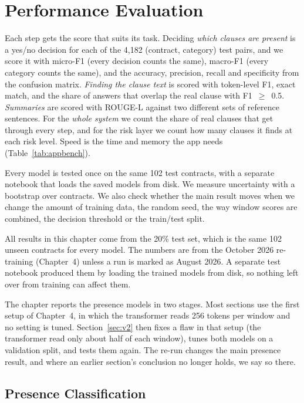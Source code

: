 \section{Performance Evaluation}
Each step gets the score that suits its task. Deciding \emph{which clauses are present} is a yes/no decision for each of the 4{,}182 (contract, category) test pairs, and we score it with micro-F1 (every decision counts the same), macro-F1 (every category counts the same), and the accuracy, precision, recall and specificity from the confusion matrix. \emph{Finding the clause text} is scored with token-level F1, exact match, and the share of answers that overlap the real clause with F1~$\geq$~0.5. \emph{Summaries} are scored with ROUGE-L against two different sets of reference sentences. For the \emph{whole system} we count the share of real clauses that get through every step, and for the risk layer we count how many clauses it finds at each risk level. Speed is the time and memory the app needs (Table~\ref{tab:appbench}).

Every model is tested once on the same 102 test contracts, with a separate notebook that loads the saved models from disk. We measure uncertainty with a bootstrap over contracts. We also check whether the main result moves when we change the amount of training data, the random seed, the way window scores are combined, the decision threshold or the train/test split.

All results in this chapter come from the 20\% test set, which is the same 102 unseen contracts for every model. The numbers are from the October 2026 re-training (Chapter~4) unless a run is marked as August 2026. A separate test notebook produced them by loading the trained models from disk, so nothing left over from training can affect them.

The chapter reports the presence models in two stages. Most sections use the first setup of Chapter~4, in which the transformer reads 256 tokens per window and no setting is tuned. Section~\ref{sec:v2} then fixes a flaw in that setup (the transformer read only about half of each window), tunes both models on a validation split, and tests them again. The re-run changes the main presence result, and where an earlier section's conclusion no longer holds, we say so there.
\subsection{Presence Classification}
